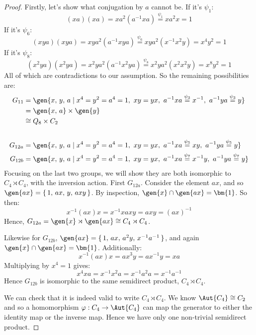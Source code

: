 \begin{proof}
    Firstly, let's show what conjugation by \(a\) cannot be.
    If it's \(\psi_1\):
    \[(xa)(xa) = xa^2(a^{-1}xa) \overset{\psi_1}{=} xa^2 x = 1\]
    If it's \(\psi_6\):
    \[(xya)(xya) = xya^2(a^{-1}xya) \overset{\psi_6}{=} xya^2(x^{-1}x^2y) = x^4 y^2 = 1\]
    If it's \(\psi_8\):
    \[(x^2 ya)(x^2 ya) = x^2 ya^2 (a^{-1}x^2 ya) \overset{\psi_8}{=} x^2 ya^2(x^2 x^2 y) = x^8 y^2 = 1\]
    All of which are contradictions to our assumption.
    So the remaining possibilities are:
    \begin{align*}
        G_{11} &= \gen{x,\,y,\,a \mid x^4 = y^2 = a^4 = 1,\ xy = yx,\ a^{-1}xa \overset{\psi_3}{=} x^{-1},\ a^{-1}ya \overset{\psi_3}{=} y} \\
            &= \gen{x,\,a} \times \gen{y} \\
            &\cong Q_8 \times C_2 \\
            & \\
        G_{12a} &= \gen{x,\,y,\,a \mid x^4 = y^2 = a^4 = 1,\ xy = yx,\ a^{-1}xa \overset{\psi_5}{=} xy,\ a^{-1}ya \overset{\psi_5}{=} y} \\
        G_{12b} &= \gen{x,\,y,\,a \mid x^4 = y^2 = a^4 = 1,\ xy = yx,\ a^{-1}xa \overset{\psi_7}{=} x^{-1}y,\ a^{-1}ya \overset{\psi_7}{=} y}
    \end{align*}
    Focusing on the last two groups, we will show they are both isomorphic to \(C_4 \rtimes C_4\),
    with the inversion action.
    First \(G_{12a}\).
    Consider the element \(ax\), and so \(\gen{ax} = \{\,1,\,ax,\,y,\,axy\,\}\).
    By inspection, \(\gen{x} \cap \gen{ax} = \bm{1}\).
    So then:
    \[x^{-1}(ax)x = x^{-1}xaxy = axy = {(ax)}^{-1}\]
    Hence, \(G_{12a} = \gen{x} \rtimes \gen{ax} \cong C_4 \rtimes C_4\).

    Likewise for \(G_{12b}\), \(\gen{ax} = \{\,1,\,ax,\,a^2 y,\,x^{-1}a^{-1}\,\}\), and again \(\gen{x} \cap
    \gen{ax} = \bm{1}\).
    Additionally:
    \[x^{-1}(ax)x = ax^3 y = ax^{-1}y = xa\]
    Multiplying by \(x^4 = 1\) gives:
    \[x^4 xa = x^{-1}x^2 a = x^{-1}a^2 a = x^{-1}a^{-1}\]
    Hence \(G_{12b}\) is isomorphic to the same semidirect product, \(C_4 \rtimes C_4\).

    We can check that it is indeed valid to write \(C_4 \rtimes C_4\).
    We know \(\Aut{C_4} \cong C_2\) and so a homomorphism \(\varphi:C_4 \to \Aut{C_4}\) can map the
    generator to either the identity map or the inverse map.
    Hence we have only one non-trivial semidirect product.
\end{proof}

